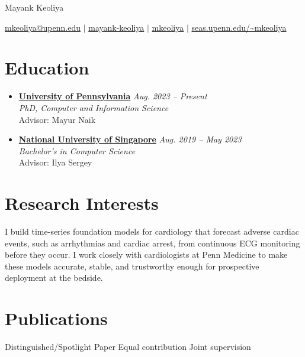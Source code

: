 \documentclass[a4paper,11pt]{article}
\newcommand{\resumeEduSubheading}[4]{
\vspace{-2pt}
  \item
    \href{#2}{\textbf{#1}} \hfill \textit{\small #3}\\
    \textit{\small{#2}} \\
    \small{#4}
}
\newcommand{\resumeSubHeadingListStart}{\begin{itemize}[leftmargin=0.15in, label={}]}
\newcommand{\resumeSubHeadingListEnd}{\end{itemize}}
\begin{document}

{\Huge Mayank Keoliya}
\\
\vspace{3pt}

\href{mailto:mkeoliya@upenn.edu}{
    \faEnvelope[regular]
    mkeoliya@upenn.edu} $|$
\href{https://www.linkedin.com/in/mayank-keoliya-021048194/}{
    \faLinkedin
    \thinspace \thinspace        
    mayank-keoliya} $|$
\href{https://github.com/mkeoliya}{
    \faGithub
    \thinspace \thinspace
    mkeoliya} $|$
\href{https://www.seas.upenn.edu/~mkeoliya}{
    \faGlobe
    \thinspace \thinspace
    seas.upenn.edu/\textasciitilde{}mkeoliya
}
\vspace{-4pt}
\section{Education}
  \resumeSubHeadingListStart
    \resumeEduSubheading
      {University of Pennsylvania}
      {PhD, Computer and Information Science}
      {Aug. 2023 -- Present}
      {Advisor: Mayur Naik}

      
    \resumeEduSubheading
      {National University of Singapore}
      {Bachelor's in Computer Science}
      {Aug. 2019 -- May 2023}
      {Advisor: Ilya Sergey}
      
      
  \resumeSubHeadingListEnd

\section{Research Interests}
I build time-series foundation models for cardiology that forecast adverse cardiac events, such as arrhythmias and cardiac arrest, from continuous ECG monitoring before they occur. I work closely with cardiologists at Penn Medicine to make these models accurate, stable, and trustworthy enough for prospective deployment at the bedside.

\section{Publications}
  \vspace{-0.4cm}
  \begin{scriptsize}\faTrophy \; Distinguished/Spotlight Paper \quad * Equal contribution \quad \textdagger \; Joint supervision\end{scriptsize}
  
\end{document}
